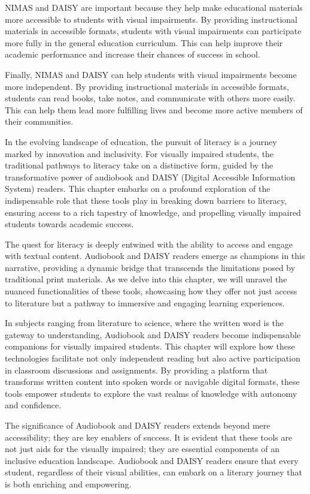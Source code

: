 \documentclass[12pt,letterpaper,twoside]{extreport}
\begin{document}
NIMAS and DAISY are important because they help make educational materials more accessible to students with visual impairments. By providing instructional materials in accessible formats, students with visual impairments can participate more fully in the general education curriculum. This can help improve their academic performance and increase their chances of success in school.

Finally, NIMAS and DAISY can help students with visual impairments become more independent. By providing instructional materials in accessible formats, students can read books, take notes, and communicate with others more easily. This can help them lead more fulfilling lives and become more active members of their communities.

In the evolving landscape of education, the pursuit of literacy is a journey marked by innovation and inclusivity. For visually impaired students, the traditional pathways to literacy take on a distinctive form, guided by the transformative power of audiobook and DAISY (Digital Accessible Information System) readers. This chapter embarks on a profound exploration of the indispensable role that these tools play in breaking down barriers to literacy, ensuring access to a rich tapestry of knowledge, and propelling visually impaired students towards academic success.

The quest for literacy is deeply entwined with the ability to access and engage with textual content. Audiobook and DAISY readers emerge as champions in this narrative, providing a dynamic bridge that transcends the limitations posed by traditional print materials. As we delve into this chapter, we will unravel the nuanced functionalities of these tools, showcasing how they offer not just access to literature but a pathway to immersive and engaging learning experiences.

In subjects ranging from literature to science, where the written word is the gateway to understanding, Audiobook and DAISY readers become indispensable companions for visually impaired students. This chapter will explore how these technologies facilitate not only independent reading but also active participation in classroom discussions and assignments. By providing a platform that transforms written content into spoken words or navigable digital formats, these tools empower students to explore the vast realms of knowledge with autonomy and confidence.

The significance of Audiobook and DAISY readers extends beyond mere accessibility; they are key enablers of success. It is evident that these tools are not just aids for the visually impaired; they are essential components of an inclusive education landscape. Audiobook and DAISY readers ensure that every student, regardless of their visual abilities, can embark on a literary journey that is both enriching and empowering.
\end{document}
